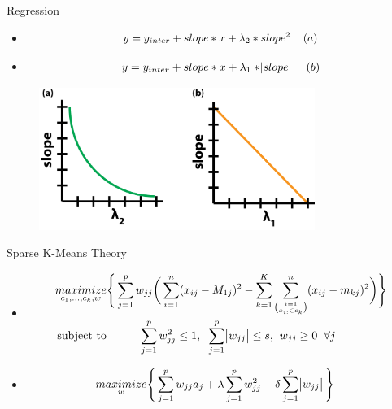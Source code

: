\documentclass{beamer}
\begin{document}
{\begin{frame}{Regression}
	\begin{itemize}
		\item
			\begin{align}\nonumber
				 y = y_{inter} + slope * x + \lambda_2 * slope^2 \hphantom{xx} \boldmath{(a)}	
			\end{align}	
		\item
			\begin{align}\nonumber
				y = y_{inter} + slope * x + \lambda_1 * \abs{slope} \hphantom{xx} \boldmath{(b)}	
			\end{align}			
	\end{itemize}	
	\begin{figure}[H]
		\centering
		\includegraphics[width=0.8\textwidth]{figures/reg4}
	\end{figure}
\end{frame}

\begin{frame}{Sparse K-Means Theory}
	\begin{itemize}
		\item<1-> \begin{align}\nonumber
			\underset{c_1,\dots,c_k,w}{maximize}& \Bigg\{ \sum_{j=1}^{p} w_{jj} \bigg( \sum_{i=1}^{n}(x_{ij}-M_{1j})^2 - \sum_{k=1}^{K}\sum_{\binom{i=1}{x_{i:} \in c_k}}^{n}(x_{ij}-m_{kj})^2 \bigg) \Bigg\}  \\ \nonumber
			\text{subject to}& \hphantom{xxxxx} \sum_{j=1}^{p} w_{jj}^{2} \leq 1 \text{,}\hphantom{x} \sum_{j=1}^{p} \abs{w_{jj}} \leq s \text{,}\hphantom{x} w_{jj} \geq 0\hphantom{x} \forall j 
		\end{align}	
		\vspace{5mm}	
		\item<2-> \begin{align}\nonumber
			\underset{w}{maximize}& \Bigg\{ \sum_{j=1}^{p} w_{jj}a_j + \lambda\sum_{j=1}^{p} w_{jj}^{2} + \delta\sum_{j=1}^{p} \abs{w_{jj}} \Bigg\}
		\end{align}	
	\end{itemize}
\end{frame}

}
\end{document}
